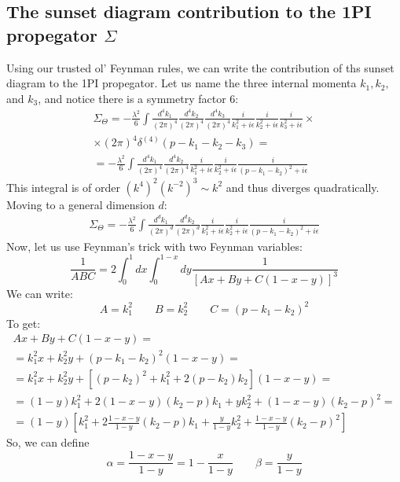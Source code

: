 \documentclass{article}
\begin{document}
\subsection{The sunset diagram contribution to the 1PI propegator $\Sigma$}
Using our trusted ol' Feynman rules, we can write the contribution of ths sunset diagram to the 1PI propegator. Let us name the three internal momenta $k_1, k_2,$ and $k_3$, and notice there is a symmetry factor $6$:
\begin{equation}
\begin{gathered}
    \Sigma_\Theta = -\frac{\lambda^2}{6} \int \frac{d^4k_1}{(2\pi)^4} \frac{d^4k_2}{(2\pi)^4} \frac{d^4k_3}{(2\pi)^4} \frac{i}{k_1^2 + i\epsilon} \frac{i}{k_2^2 + i\epsilon} \frac{i}{k_3^2 + i\epsilon} \times \\ \times
    (2\pi)^4\delta^{(4)}\left(p - k_1 - k_2 - k_3\right) = \\ =
     -\frac{\lambda^2}{6} \int \frac{d^4k_1}{(2\pi)^4} \frac{d^4k_2}{(2\pi)^4}\frac{i}{k_1^2 + i\epsilon} \frac{i}{k_2^2 + i\epsilon} \frac{i}{(p - k_1 - k_2)^2 + i\epsilon}
\end{gathered}
\end{equation}
This integral is of order $\left(k^4\right)^2\left(k^{-2}\right)^3 \sim k^2$ and thus diverges quadratically. Moving to a general dimension $d$:
\begin{equation}
\begin{gathered}
    \Sigma_\Theta = -\frac{\lambda^2}{6} \int \frac{d^dk_1}{(2\pi)^d} \frac{d^dk_2}{(2\pi)^d}\frac{i}{k_1^2 + i\epsilon} \frac{i}{k_2^2 + i\epsilon} \frac{i}{(p - k_1 - k_2)^2 + i\epsilon}
\end{gathered}
\end{equation}
Now, let us use Feynman's trick with two Feynman variables:
\begin{equation}
    \frac{1}{ABC} = 2\int_0^1 dx \int_0^{1-x} dy \frac{1}{\left[Ax + By + C(1 - x - y)\right]^3}
\end{equation}
We can write:
\begin{equation}
    A = k_1^2 \qquad B = k_2^2 \qquad C = (p - k_1 - k_2)^2
\end{equation}
To get:
\begin{equation}
\begin{gathered}
    Ax + By + C(1 - x - y) = \\ =
    k_1^2x + k_2^2y + (p - k_1 - k_2)^2(1 - x - y) = \\ =
    k_1^2x + k_2^2y + \left[
        (p - k_2)^2 + k_1^2 + 2(p - k_2)k_2
    \right](1 - x - y) = \\ =
    (1 - y)k_1^2 + 2(1 - x - y)(k_2 - p)k_1 + yk_2^2 + (1 - x - y)(k_2 - p)^2 = \\ =
    (1 - y)\left[
        k_1^2 + 2\frac{1 - x - y}{1 - y}(k_2 - p)k_1 + \frac{y}{1 - y}k_2^2 + \frac{1 - x - y}{1 - y}(k_2 - p)^2
    \right]
\end{gathered}
\end{equation}
So, we can define
\begin{equation}
    \alpha = \frac{1 - x - y}{1 - y} = 1-  \frac{x}{1 - y}
    \qquad
    \beta = \frac{y}{1 - y}
\end{equation}
\end{document}
